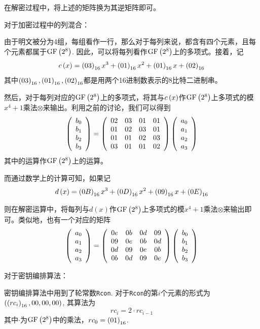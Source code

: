 在解密过程中，将上述的矩阵换为其逆矩阵即可。\par
对于加密过程中的列混合：\par
由于明文被分为4组，每组看作一行，那么对于每列来说，都含有四个元素，且每个元素都属于$\mathrm{GF}\left( {2^8}\right)$. 因此，可以将每列看作$\mathrm{GF}\left( {2^8}\right)$上的多项式。接着，记
\begin{equation}
c\left( {x}\right)=\left( {03}\right)_{16}x^3+\left( {01}\right)_{16}x^2+\left( {01}\right)_{16}x+\left( {02}\right)_{16}
\end{equation}
其中$\left( {03}\right)_{16}, \left( {01}\right)_{16}, \left( {02}\right)_{16}$都是用两个16进制数表示的8比特二进制串。\par
然后，对于每列对应的$\mathrm{GF}\left( {2^8}\right)$上的多项式，将其与$c\left( {x}\right)$作$\mathrm{GF}\left( {2^8}\right)$上多项式的模$x^4+1$乘法$\otimes$来输出。利用之前的讨论，我们可以得到
\begin{equation}
\left( {\begin{array}{c}b_0\\b_1\\b_2\\b_3\end{array}}\right)=\left( {\begin{array}{cccc}02&03&01&01\\01&02&03&01\\01&01&02&03\\03&01&01&02\end{array}}\right)\left( {\begin{array}{c}a_0\\a_1\\a_2\\a_3\end{array}}\right)
\end{equation}
其中的运算作$\mathrm{GF}\left( {2^8}\right)$上的运算。\par
而通过数学上的计算可知，如果记
\begin{equation}
d\left( {x}\right)=\left( {0B}\right)_{16}x^3+\left( {0D}\right)_{16}x^2+\left( {09}\right)_{16}x+\left( {0E}\right)_{16}
\end{equation}

则在解密运算中，将每列与$d(x)$作$\mathrm{GF}\left( {2^8}\right)$上多项式的模$x^4+1$乘法$\otimes$来输出即可。类似地，也有一个对应的矩阵
\begin{equation}
\left( {\begin{array}{c}a_0\\a_1\\a_2\\a_3\end{array}}\right)=\left( {\begin{array}{cccc}0e&0b&0d&09\\09&0e&0b&0d\\0d&09&0e&0b\\0b&0d&09&0e\end{array}}\right)\left( {\begin{array}{c}b_0\\b_1\\b_2\\b_3\end{array}}\right)
\end{equation}

对于密钥编排算法：\par
密钥编排算法中用到了轮常数\verb`Rcon`. 对于\verb`Rcon`的第$i$个元素的形式为$\left( {\left( {rc_i}\right)_{16}, 00, 00, 00}\right)$, 其算法为
\begin{equation}
rc_i=2\cdot rc_{i-1}
\end{equation}
其中$\cdot$为$\mathrm{GF}\left( {2^8}\right)$中的乘法，$rc_0=\left( {01}\right)_{16}$.